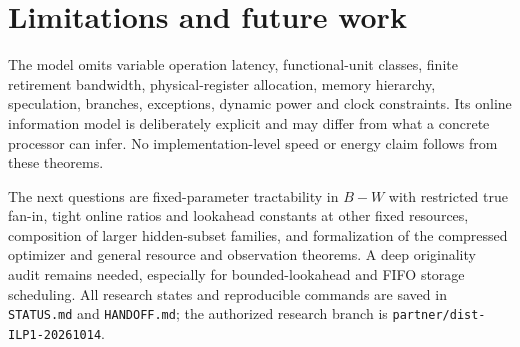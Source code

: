 \documentclass[11pt]{article}
\begin{document}
\section{Limitations and future work}
The model omits variable operation latency, functional-unit classes, finite
retirement bandwidth, physical-register allocation, memory hierarchy,
speculation, branches, exceptions, dynamic power and clock constraints.
Its online information model is deliberately explicit and may differ from
what a concrete processor can infer. No implementation-level speed or energy
claim follows from these theorems.

The next questions are fixed-parameter tractability in $B-W$ with restricted
true fan-in, tight online ratios and lookahead constants
at other fixed resources, composition of larger hidden-subset families,
and formalization of the compressed optimizer and general
resource and observation theorems. A deep originality audit remains needed,
especially for bounded-lookahead and FIFO storage scheduling. All research
states and reproducible commands are saved in \texttt{STATUS.md} and
\texttt{HANDOFF.md}; the authorized research branch is
\texttt{partner/dist-ILP1-20261014}.
\end{document}
